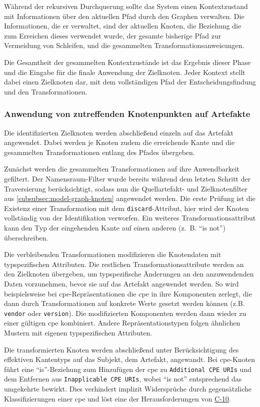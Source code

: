 Während der rekursiven Durchquerung sollte das System einen Kontextzustand mit Informationen über den aktuellen Pfad durch den Graphen verwalten.
Die Informationen, die er verwaltet, sind der aktuellen Knoten, die Beziehung die zum Erreichen dieses verwendet wurde, der gesamte bisherige Pfad zur Vermeidung von Schleifen, und die gesammelten Transformationsanweisungen.

Die Gesamtheit der gesammelten Kontextzustände ist das Ergebnis dieser Phase und die Eingabe für die finale Anwendung der Zielknoten.
Jeder Kontext stellt dabei einen Zielknoten dar, mit dem vollständigen Pfad der Entscheidungsfindung und den Transformationen.

\subsubsection{Anwendung von zutreffenden Knotenpunkten auf Artefakte}\label{subsubsec:model-result-processing-apply-nodes-to-artifact}

Die identifizierten Zielknoten werden abschließend einzeln auf das Artefakt angewendet.
Dabei werden je Knoten zudem die erreichende Kante und die gesammelten Transformationen entlang des Pfades übergeben.

Zunächst werden die gesammelten Transformationen auf ihre Anwendbarkeit gefiltert.
Der Namensraum-Filter wurde bereits während dem letzten Schritt der Traversierung berücksichtigt, sodass nun die Quellartefakt- und Zielknotenfilter aus \autoref{subsubsec:model-graph-knoten} angewendet werden.
Die erste Prüfung ist die Existenz einer Transformation mit dem \texttt{discard}-Attribut, hier wird der Knoten vollständig von der Identifikation verworfen.
Ein weiteres Transformationsattribut kann den Typ der eingehenden Kante auf einen anderen (z.\ B. \enquote{is not}) überschreiben.

Die verbleibenden Transformationen modifizieren die Knotendaten mit typspezifischen Attributen.
Die restlichen Transformationsattribute werden an den Zielknoten übergeben, um typspezifische Änderungen an den anzuwendenden Daten vorzunehmen, bevor sie auf das Artefakt angewendet werden.
So wird beispielsweise bei \acrshort{cpe}-Repräsentationen die \acrshort{cpe} in ihre Komponenten zerlegt, die dann durch Transformationen auf konkrete Werte gesetzt werden können (z.B. \texttt{vendor} oder \texttt{version}).
Die modifizierten Komponenten werden dann wieder zu einer gültigen \acrshort{cpe} kombiniert.
Andere Repräsentationstypen folgen ähnlichen Mustern mit eigenen typspezifischen Attributen.

Die transformierten Knoten werden abschließend unter Berücksichtigung des effektiven Kantentyps auf das Subjekt, dem Artefakt, angewandt.
Bei \acrshort{cpe}-Knoten führt eine \enquote{is}-Beziehung zum Hinzufügen der \acrshort{cpe} zu \texttt{Additional CPE URIs} und dem Entfernen aus \texttt{Inapplicable CPE URIs}, wobei \enquote{is not} entsprechend das umgekehrte bewirkt.
Dies verhindert implizit Widersprüche durch gegensätzliche Klassifizierungen einer \acrshort{cpe} und löst eine der Herausforderungen von \hyperref[subsec:c-10-order-dependency]{C-10}.
